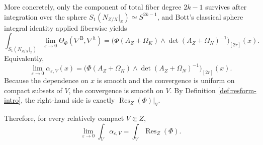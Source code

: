 \documentclass[12pt,a4paper,dvipsnames,x11names]{amsart}
\numberwithin{equation}{section}
\theoremstyle{plain}
\theoremstyle{definition}
\theoremstyle{remark}
\begin{document}
More concretely, only the component of total fiber degree $2k-1$ survives after integration over the sphere $S_1(N_{Z/X}|_x)\simeq S^{2k-1}$, and Bott's classical sphere integral identity applied fiberwise yields
\begin{equation}\label{eq:bott-fiber-identity}
\int_{S_1(N_{Z/X}|_x)} \lim_{\varepsilon\to 0}\Theta_\Phi(\nabla^{\mathrm B},\nabla^h)
=
\Big(\Phi(A_Z+\Omega_K)\wedge \det(A_Z+\Omega_N)^{-1}\Big)_{[2r]}(x).
\end{equation}
Equivalently,
\begin{equation}\label{eq:alpha-limit-pointwise}
\lim_{\varepsilon\to 0}\alpha_{\varepsilon,V}(x)
=
\Big(\Phi(A_Z+\Omega_K)\wedge \det(A_Z+\Omega_N)^{-1}\Big)_{[2r]}(x).
\end{equation}
Because the dependence on $x$ is smooth and the convergence is uniform on compact subsets of $V$, the convergence is smooth on $V$. By Definition \ref{def:resform-intro}, the right-hand side is exactly $\operatorname{Res}_Z(\Phi)|_V$.

Therefore, for every relatively compact $V\Subset Z$,
\begin{equation}\label{eq:local-convergence-on-V}
\lim_{\varepsilon\to 0}\int_V \alpha_{\varepsilon,V}
=
\int_V \operatorname{Res}_Z(\Phi).
\end{equation}
\end{document}
